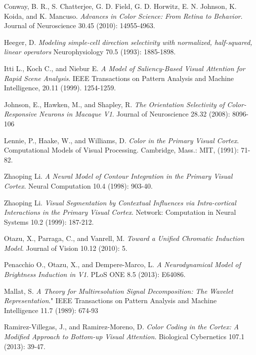 \documentclass[journal,onecolumn]{IEEEtran}
\begin{document}
\begin{thebibliography}{1}

    Conway, B. R., S. Chatterjee, G. D. Field, G. D. Horwitz, E. N. Johnson, K. Koida, and K. Mancuso.
    \emph{Advances in Color Science: From Retina to Behavior}.
    Journal of Neuroscience 30.45 (2010): 14955-4963.

    Heeger, D.
    \emph{Modeling simple-cell direction selectivity with normalized, half-squared, linear operators}
    Neurophysiology 70.5 (1993): 1885-1898.

    Itti L., Koch C., and Niebur E.
    \emph{A Model of Saliency-Based Visual Attention for Rapid Scene Analysis}.
    IEEE Transactions on Pattern Analysis and Machine Intelligence, 20.11 (1999). 1254-1259.

    Johnson, E., Hawken, M., and Shapley, R.
    \emph{The Orientation Selectivity of Color-Responsive Neurons in Macaque V1}.
    Journal of Neuroscience 28.32 (2008): 8096-106

    Lennie, P., Haake, W., and Williams, D.
    \emph{Color in the Primary Visual Cortex}.
    Computational Models of Visual Processing.
    Cambridge, Mass.: MIT, (1991): 71-82.

  Zhaoping Li.
  \emph{A Neural Model of Contour Integration in the Primary Visual Cortex}.
  Neural Computation 10.4 (1998): 903-40.

  Zhaoping Li.
  \emph{Visual Segmentation by Contextual Influences via Intra-cortical Interactions in the Primary Visual Cortex}.
  Network: Computation in Neural Systems 10.2 (1999): 187-212.

    Otazu, X., Parraga, C., and Vanrell, M.
    \emph{Toward a Unified Chromatic Induction Model}.
    Journal of Vision 10.12 (2010): 5.

    Penacchio O., Otazu, X., and Dempere-Marco, L.
    \emph{A Neurodynamical Model of Brightness Induction in V1}.
    PLoS ONE 8.5 (2013): E64086.

    Mallat, S.
    \emph{A Theory for Multiresolution Signal Decomposition: The Wavelet Representation}."
    IEEE Transactions on Pattern Analysis and Machine Intelligence 11.7 (1989): 674-93

    Ramirez-Villegas, J., and Ramirez-Moreno, D.
    \emph{Color Coding in the Cortex: A Modified Approach to Bottom-up Visual Attention}.
    Biological Cybernetics 107.1 (2013): 39-47.


\end{thebibliography}
\end{document}
